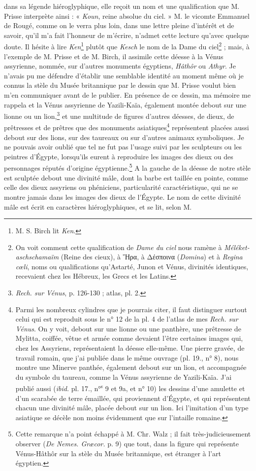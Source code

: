 \documentclass{article}
\begin{document}
dans sa légende hiéroglyphique, elle reçoit un nom et une qualification que M. Prisse interprète ainsi : « \emph{Koun}, reine absolue du ciel. » M. le vicomte Emmanuel de Rougé, comme on le verra plus loin, dans une lettre pleine d'intérêt et de savoir, qu'il m'a fait l'honneur de m'écrire, n'admet cette lecture qu'avec quelque doute. Il hésite à lire \emph{Ken}\footnote{M. S. Birch lit \emph{Ken}.} plutôt que \emph{Kesch} le nom de la Dame du ciel\footnote{On voit comment cette qualification de \emph{Dame du ciel} nous ramène à \emph{Méléket-aschschamaïm} (Reine des cieux), à \textgreek{Ἥρα}, à \textgreek{Δέσποινα} (\emph{Domina}) et à \emph{Regina cœli}, noms ou qualifications qu'Astarté, Junon et Vénus, divinités identiques, recevaient chez les Hébreux, les Grecs et les Latins.} ; mais, à l'exemple de M. Prisse et de M. Birch, il assimile cette déesse à la Vénus assyrienne, nommée, sur d'autres monuments égyptiens, \emph{Hâthôr} ou \emph{Athyr}. Je n'avais pu me défendre d'établir une semblable identité au moment même où je connus la stèle du Musée britannique par le dessin que M. Prisse voulut bien m'en communiquer avant de le publier. En présence de ce dessin, ma mémoire me rappela et la Vénus assyrienne de Yazili-Kaïa, également montée debout sur une lionne ou un lion,\footnote{\emph{Rech. sur Vénus}, p. 126-130 ; atlas, pl. 2.} et une multitude de figures d'autres déesses, de dieux, de prêtresses et de prêtres que des monuments asiatiques\footnote{Parmi les nombreux cylindres que je pourrais citer, il faut distinguer surtout celui qui est reproduit sous le n° 12 de la pl. 4 de l'atlas de mes \emph{Rech. sur Vénus}. On y voit, debout sur une lionne ou une panthère, une prêtresse de Mylitta, coiffée, vêtue et armée comme devaient l'être certaines images qui, chez les Assyriens, représentaient la déesse elle-même. Une pierre gravée, de travail romain, que j'ai publiée dans le même ouvrage (pl. 19., n° 8), nous montre une Minerve panthée, également debout sur un lion, et accompagnée du symbole du taureau, comme la Vénus assyrienne de Yazili-Kaïa. J'ai publié aussi (\emph{ibid.} pl. 17., n°\textsuperscript{s} 9 et 9a, et n° 10) les dessins d'une amulette et d'un scarabée de terre émaillée, qui proviennent d'Égypte, et qui représentent chacun une divinité mâle, placée debout sur un lion. Ici l'imitation d'un type asiatique se décèle non moins évidemment que sur l'intaille romaine.} représentent placées aussi debout sur des lions, sur des taureaux ou sur d'autres animaux symboliques. Je ne pouvais avoir oublié que tel ne fut pas l'usage suivi par les sculpteurs ou les peintres d'Égypte, lorsqu'ils eurent à reproduire les images des dieux ou des personnages réputés d'origine égyptienne.\footnote{Cette remarque n'a point échappé à M. Chr. Walz ; il fait très-judicieusement observer (\emph{De Nemes. Græcor.} p. 9) que tout, dans la figure qui représente Vénus-Hâthôr sur la stèle du Musée britannique, est étranger à l'art égyptien.} A la gauche de la déesse de notre stèle est sculptée debout une divinité mâle, dont la barbe est taillée en pointe, comme celle des dieux assyriens ou phéniciens, particularité caractéristique, qui ne se montre jamais dans les images des dieux de l'Égypte. Le nom de cette divinité mâle est écrit en caractères hiéroglyphiques, et se lit, selon M. 
\end{document}
